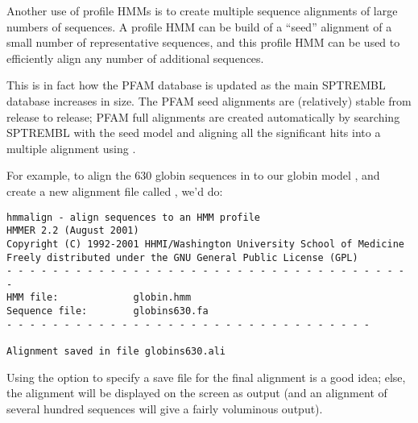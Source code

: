 Another use of profile HMMs is to create multiple sequence alignments
of large numbers of sequences. A profile HMM can be build of a
``seed'' alignment of a small number of representative sequences, and
this profile HMM can be used to efficiently align any number of
additional sequences. 

This is in fact how the PFAM database is updated as the main SPTREMBL
database increases in size. The PFAM seed alignments are (relatively)
stable from release to release; PFAM full alignments are created
automatically by searching SPTREMBL with the seed model and aligning
all the significant hits into a multiple alignment using .

For example, to align the 630 globin sequences in 
to our globin model , and create a new alignment file
called , we'd do:

\vspace{1.5em}
\vspace{-1.5em}
{\small\begin{verbatim}
hmmalign - align sequences to an HMM profile
HMMER 2.2 (August 2001)
Copyright (C) 1992-2001 HHMI/Washington University School of Medicine
Freely distributed under the GNU General Public License (GPL)
- - - - - - - - - - - - - - - - - - - - - - - - - - - - - - - - - - - -
HMM file:             globin.hmm
Sequence file:        globins630.fa
- - - - - - - - - - - - - - - - - - - - - - - - - - - - - - - -

Alignment saved in file globins630.ali
\end{verbatim}}

Using the  option to specify a save file for the final
alignment is a good idea; else, the alignment will be displayed on the
screen as output (and an alignment of several hundred sequences will
give a fairly voluminous output).


